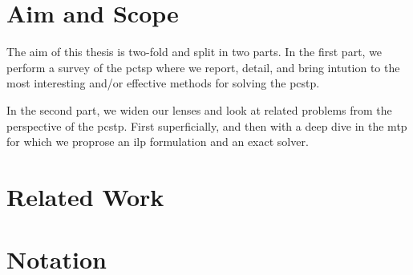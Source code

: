 \section{Aim and Scope}
The aim of this thesis is two-fold and split in two parts. In the first part, we perform a
survey of the \acrlong{pctsp} where we report, detail, and bring intution to the most interesting
and/or effective methods for solving the \gls{pcstp}.

In the second part, we widen our lenses and look at related problems from the perspective of
the \gls{pcstp}. First superficially, and then with a deep dive in the \acrlong{mtp} for which
we proprose an \gls{ilp} formulation and an exact solver.

\section{Related Work}

\section{Notation}
\label{sec:intro:notation}


